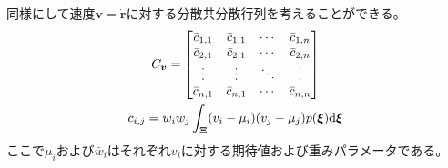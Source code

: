 \documentclass[10pt,a4j,twocolumn]{ltjsarticle}
\begin{document}
同様にして速度$\bm{v} = \dot{\bm{r}}$に対する分散共分散行列を考えることができる。
\begin{gather}
  C_{\bm{v}} = \begin{bmatrix}
                 \bar{c}_{1, 1} & \bar{c}_{1, 1} & \cdots & \bar{c}_{1, n} \\
                 \bar{c}_{2, 1} & \bar{c}_{2, 1} & \cdots & \bar{c}_{2, n} \\
                 \vdots         & \vdots         & \ddots & \vdots         \\
                 \bar{c}_{n, 1} & \bar{c}_{n, 1} & \cdots & \bar{c}_{n, n} \\
               \end{bmatrix} \\
  \bar{c}_{i, j} = \bar{w}_{i} \bar{w}_{j} \int_{\bm{\Xi}} (v_{i} - \mu_{i})(v_{j} - \mu_{j}) p(\bm{\xi}) \mathrm{d}\bm{\xi} \notag
\end{gather}
ここで$\mu_{i}$および$\bar{w}_{i}$はそれぞれ$v_{i}$に対する期待値および重みパラメータである。
\end{document}
